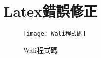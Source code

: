 \documentclass{report}
\begin{document}
\chapter{Latex錯誤修正}

\begin{figure}[!ht]
\centering
\texttt{[image: Wali程式碼]}
\caption{\Large Wali程式碼}
\label{fig:wali_code}
\end{figure}
\end{document}

